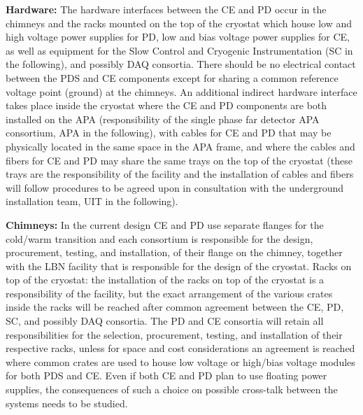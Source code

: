\hspace{0.5cm}\textbf{Hardware: }The hardware interfaces between the CE and PD occur in the chimneys and the racks mounted on the top of the cryostat which house low and high voltage power supplies for PD, low and bias voltage power supplies for CE, as well as equipment for the Slow Control and Cryogenic Instrumentation (SC in the following), and possibly DAQ consortia. There should be no electrical contact between the PDS and CE components except for sharing a common reference voltage point (ground) at the chimneys. An additional indirect hardware interface takes place inside the cryostat where the CE and PD components are both installed on the APA (responsibility of the single phase far detector APA consortium, APA in the following), with cables for CE and PD that may be physically located in the same space in the APA frame, and where the cables and fibers for CE and PD may share the same trays on the top of the cryostat (these trays are the responsibility of the facility and the installation of cables and fibers will follow procedures to be agreed upon in consultation with the underground installation team, UIT in the following).

\textbf{Chimneys: }In the current design CE and PD use separate flanges for the cold/warm transition and each consortium is responsible for the design, procurement, testing, and installation, of their flange on the chimney, together with the LBN facility that is responsible for the design of the cryostat.
Racks on top of the cryostat: the installation of the racks on top of the cryostat is a responsibility of the facility, but the exact arrangement of the various crates inside the racks will be reached after common agreement between the CE, PD, SC, and possibly DAQ consortia. The PD and CE consortia will retain all responsibilities for the selection, procurement, testing, and installation of their respective racks, unless for space and cost considerations an agreement is reached where common crates are used to house low voltage or high/bias voltage modules for both PDS and CE. Even if both CE and PD plan to use floating power supplies, the consequences of such a choice on possible cross-talk between the systems needs to be studied. 

